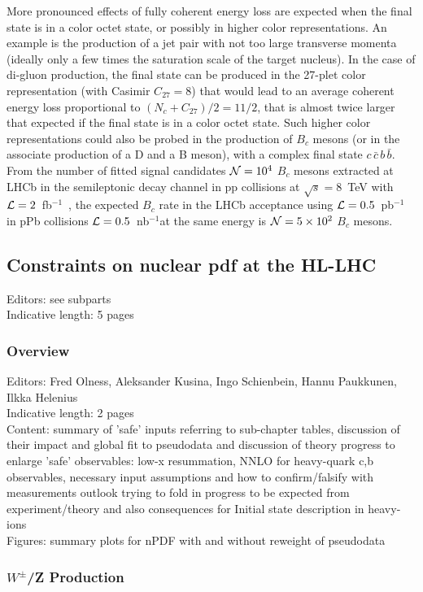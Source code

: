 \documentclass[../report.tex]{subfiles}
\begin{document}
More pronounced effects of fully coherent energy loss are expected when the final state is in a color octet state, or possibly in higher color representations. An example is the production of a jet pair with not too large transverse momenta (ideally only a few times the saturation scale of the target nucleus). In the case of di-gluon production, the final state can be produced in the 27-plet color representation (with Casimir $C_{27}=8$) that would lead to an average coherent energy loss proportional to $(N_c+C_{27})/2=11/2$, that is almost twice larger that expected if the final state is in a color octet state. Such higher color representations could also be probed in the production of $B_c$ mesons (or in the associate production of a D and a B meson), with a complex final state $c\,\bar{c}\,b\,\bar{b}$. From the number of fitted signal candidates ${\cal N}=10^4$ $B_c$ mesons extracted at LHCb in the semileptonic decay channel in pp collisions at $\sqrt{s}=8$~TeV with ${\cal L}=2$~fb$^{-1}$~\cite{Aaij:2014bva}, the expected $B_c$ rate in the LHCb acceptance using ${\cal L}=0.5$~pb$^{-1}$ in pPb collisions ${\cal L}=0.5$~nb$^{-1}$at the same energy is ${\cal N}=5\times 10^2$ $B_c$ mesons.

\subsection{Constraints on nuclear pdf at the HL-LHC}
\label{sec:nPDFs}
Editors: see subparts\\
Indicative length: 5 pages
\subsubsection{Overview}
Editors: Fred Olness, Aleksander Kusina, Ingo Schienbein, Hannu Paukkunen,   Ilkka Helenius\\
Indicative length: 2 pages \\
Content: summary of 'safe' inputs referring to sub-chapter tables, discussion of their impact and global fit to pseudodata and discussion of theory progress to enlarge 'safe' observables: low-x resummation, NNLO for heavy-quark c,b observables, necessary input assumptions and how to confirm/falsify with measurements
outlook trying to fold in progress to be expected from experiment/theory and also consequences for Initial state description in heavy-ions \\
Figures: summary plots for nPDF with and without reweight of pseudodata


\subsubsection{$W^\pm$/Z Production}
\end{document}
